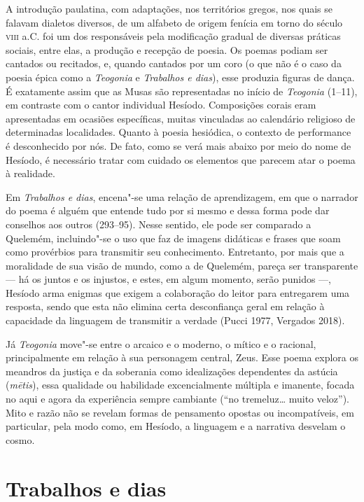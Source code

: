 A introdução paulatina, com adaptações, nos territórios gregos, nos
quais se falavam dialetos diversos, de um alfabeto de origem fenícia em
torno do século \textsc{viii} a.C. foi um dos responsáveis pela modificação
gradual de diversas práticas sociais, entre elas, a produção e recepção
de poesia. Os poemas podiam ser cantados ou recitados, e, quando
cantados por um coro (o que não é o caso da poesia épica como a
\emph{Teogonia} e \emph{Trabalhos e dias}), esse produzia figuras de dança. É exatamente assim que as Musas são representadas no início de \emph{Teogonia} (1--11), em contraste com o
cantor individual Hesíodo. Composições corais eram apresentadas em
ocasiões específicas, muitas vinculadas ao calendário religioso de
determinadas localidades. Quanto à poesia hesiódica, o contexto de
performance é desconhecido por nós. De fato, como se verá mais abaixo
por meio do nome de Hesíodo, é necessário tratar com cuidado os
elementos que parecem atar o poema à realidade.


Em \emph{Trabalhos e dias}, encena"-se uma relação de aprendizagem, em que
o narrador do poema é alguém que entende tudo por si mesmo e dessa
forma pode dar conselhos aos outros (293--95). Nesse sentido, ele pode
ser comparado a Quelemém, incluindo"-se o uso que faz de imagens
didáticas e frases que soam como provérbios para transmitir seu
conhecimento. Entretanto, por mais que a moralidade de sua visão de
mundo, como a de Quelemém, pareça ser transparente --- há os juntos e os
injustos, e estes, em algum momento, serão punidos ---, Hesíodo
arma enigmas que exigem a colaboração do
leitor para entregarem uma resposta, sendo que esta não elimina certa
desconfiança geral em relação à capacidade da linguagem de transmitir a
verdade (Pucci 1977, Vergados 2018).

Já \emph{Teogonia} move"-se entre o arcaico e o moderno, o mítico e o racional,
principalmente em relação à sua personagem central, Zeus.
Esse poema explora os meandros da
justiça e da soberania como idealizações dependentes da astúcia
(\emph{mētis}), essa qualidade ou habilidade excencialmente múltipla e
imanente, focada no aqui e agora da experiência sempre cambiante (``no
tremeluz\ldots{} muito veloz''). Mito e razão não
se revelam formas de pensamento opostas ou incompatíveis, em particular,
pela modo como, em Hesíodo, a linguagem e a narrativa desvelam o cosmo.

\section*{Trabalhos e dias}

